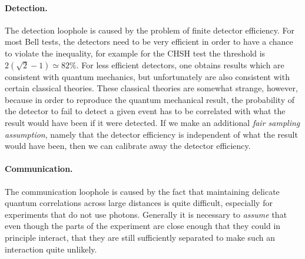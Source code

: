 \paragraph{Detection.} The detection loophole is caused by the problem of finite detector efficiency. For most Bell tests, the detectors need to be very efficient in order to have a chance to violate the inequality, for example for the CHSH test the threshold is $2(\sqrt{2}-1)\simeq82\%$. For less efficient detectors, one obtains results which are consistent with quantum mechanics, but unfortunately are also consistent with certain classical theories. These classical theories are somewhat strange, however, because in order to reproduce the quantum mechanical result, the probability of the detector to fail to detect a given event has to be correlated with what the result would have been if it were detected. If we make an additional \emph{fair sampling assumption}, namely that the detector efficiency is independent of what the result would have been, then we can calibrate away the detector efficiency.

\paragraph{Communication.} The communication loophole is caused by the fact that maintaining delicate quantum correlations across large distances is quite difficult, especially for experiments that do not use photons. Generally it is necessary to \emph{assume} that even though the parts of the experiment are close enough that they could in principle interact, that they are still sufficiently separated to make such an interaction quite unlikely.

